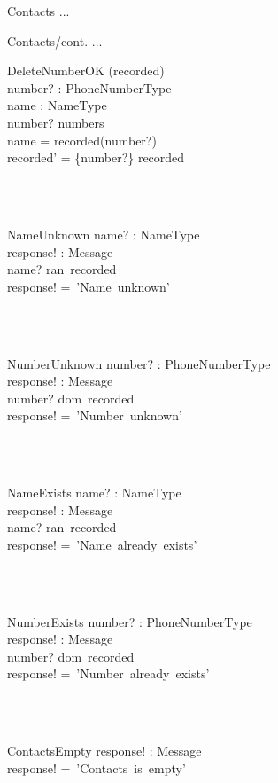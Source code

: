 \documentclass[12pt]{article}
\begin{document}
\begin{spacing}{1.5}
\begin{class}{Contacts}
...
\end{class}
\newpage
\begin{class}{Contacts/cont.}
...
\also
\begin{op}{DeleteNumberOK}
\Delta (recorded) \\
number? : PhoneNumberType\\
name : NameType\\
\ST
number? \in numbers\\
name = recorded(number?)\\
recorded' = \{number?\} \ndres recorded \\
\end{op}\\
\\
\begin{op}{NameUnknown}
name? : NameType\\
response! : Message\\
\ST
name? \notin ran~recorded\\
response! =~'Name~unknown'
\end{op}\\
\\
\begin{op}{NumberUnknown}
number? : PhoneNumberType\\
response! : Message\\
\ST
number? \notin dom~recorded\\
response! =~'Number~unknown'
\end{op}\\
\\
\begin{op}{NameExists}
name? : NameType\\
response! : Message\\
\ST
name? \in ran~recorded\\
response! =~'Name~already~exists'
\end{op}\\
\\
\begin{op}{NumberExists}
number? : PhoneNumberType\\
response! : Message\\
\ST
number? \in dom~recorded\\
response! =~'Number~already~exists'
\end{op}\\
\\
\begin{op}{ContactsEmpty}
response! : Message\\
\ST
response! =~'Contacts~is~empty'

\end{op}
\end{class}
\end{spacing}
\end{document}
